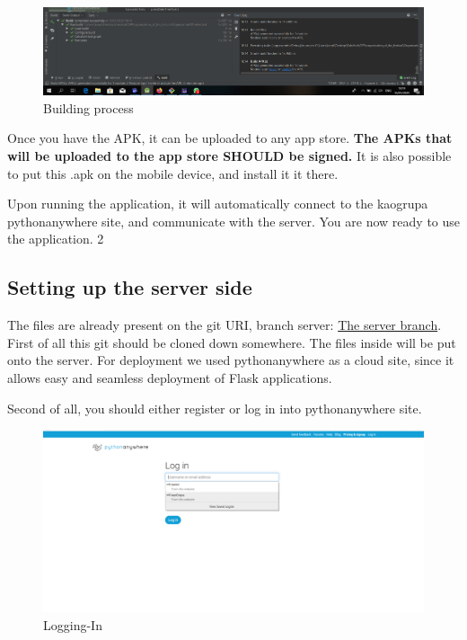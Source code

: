 			\begin{figure}[H]
				\includegraphics[width=\linewidth]{images/Deploy_M_5.png}
				\caption{Building process}
				\label{fig:install_5}
			\end{figure}
			
			Once you have the APK, it can be uploaded to any app store. \textbf{The APKs that will be uploaded to the app store SHOULD be signed.} It is also possible to put this .apk on the mobile device, and install it it there.
			
			Upon running the application, it will automatically connect to the kaogrupa pythonanywhere site, and communicate with the server. You are now ready to use the application. 2
			
			\subsection{Setting up the server side}
				
				The files are already present on the git URI, branch server: \href{https://gitlab.com/barbil/organization_of_the_festival/tree/server}{The server branch}. First of all this git should be cloned down somewhere. The files inside will be put onto the server. For deployment we used pythonanywhere as a cloud site, since it allows easy and seamless deployment of Flask applications.
				
				Second of all, you should either register or log in into pythonanywhere site.
				\begin{figure}[H]
					\includegraphics[width=\linewidth]{images/Deploy_1.png}
					\caption{Logging-In}
					\label{fig:deployment_1}
				\end{figure}
			
